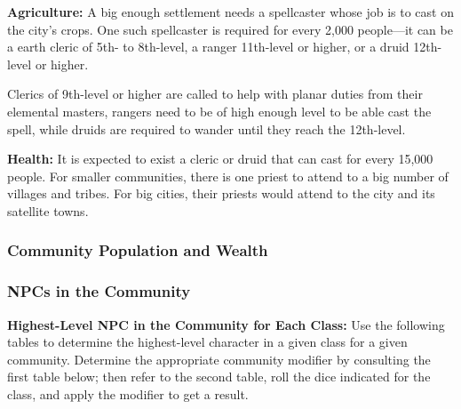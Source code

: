 
\textbf{Agriculture:} A big enough settlement needs a spellcaster whose job is to cast  on the city's crops. One such spellcaster is required for every 2,000 people---it can be a earth cleric of 5th- to 8th-level, a ranger 11th-level or higher, or a druid 12th-level or higher.

Clerics of 9th-level or higher are called to help with planar duties from their elemental masters, rangers need to be of high enough level to be able cast the spell, while druids are required to wander until they reach the 12th-level.

\textbf{Health:} It is expected to exist a cleric or druid that can cast  for every 15,000 people. For smaller communities, there is one priest to attend to a big number of villages and tribes. For big cities, their priests would attend to the city and its satellite towns.

\subsubsection{Community Population and Wealth}
\subsubsection{NPCs in the Community}
\textbf{Highest-Level NPC in the Community for Each Class:} Use the following tables to determine the highest-level character in a given class for a given community. Determine the appropriate community modifier by consulting the first table below; then refer to the second table, roll the dice indicated for the class, and apply the modifier to get a result.

